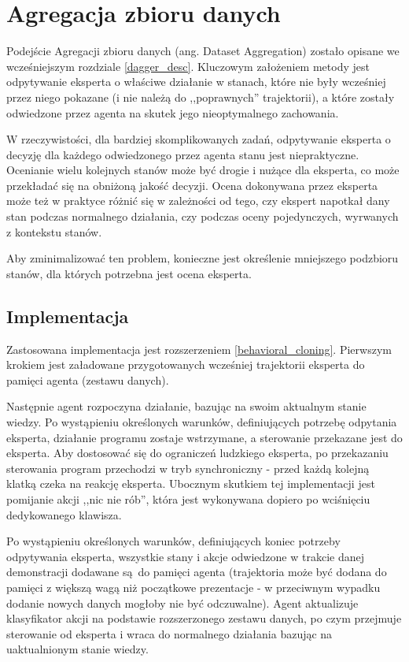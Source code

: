 \section{Agregacja zbioru danych}\label{dagger}

Podejście Agregacji zbioru danych (ang. Dataset Aggregation) \cite{DBLP:journals/corr/abs-1011-0686} zostało opisane we wcześniejszym rozdziale \ref{dagger_desc}. Kluczowym założeniem metody jest odpytywanie eksperta o właściwe działanie w stanach, które nie były wcześniej przez niego pokazane (i nie należą do ,,poprawnych'' trajektorii), a które zostały odwiedzone przez agenta na skutek jego nieoptymalnego zachowania.

W rzeczywistości, dla bardziej skomplikowanych zadań, odpytywanie eksperta o decyzję dla każdego odwiedzonego przez agenta stanu jest niepraktyczne. Ocenianie wielu kolejnych stanów może być drogie i nużące dla eksperta, co może przekładać się na obniżoną jakość decyzji. Ocena dokonywana przez eksperta może też w praktyce różnić się w zależności od tego, czy ekspert napotkał dany stan podczas normalnego działania, czy podczas oceny pojedynczych, wyrwanych z kontekstu stanów.

Aby zminimalizować ten problem, konieczne jest określenie mniejszego podzbioru stanów, dla których potrzebna jest ocena eksperta.


\subsection{Implementacja} 
Zastosowana implementacja jest rozszerzeniem \ref{behavioral_cloning}. Pierwszym krokiem jest załadowane przygotowanych wcześniej trajektorii eksperta do pamięci agenta (zestawu danych).

Następnie agent rozpoczyna działanie, bazując na swoim aktualnym stanie wiedzy. Po wystąpieniu określonych warunków, definiujących potrzebę odpytania eksperta, działanie programu zostaje wstrzymane, a sterowanie przekazane jest do eksperta. Aby dostosować się do ograniczeń ludzkiego eksperta, po przekazaniu sterowania program przechodzi w tryb synchroniczny - przed każdą kolejną klatką czeka na reakcję eksperta. Ubocznym skutkiem tej implementacji jest pomijanie akcji ,,nic nie rób'', która jest wykonywana dopiero po wciśnięciu dedykowanego klawisza.

Po wystąpieniu określonych warunków, definiujących koniec potrzeby odpytywania eksperta, wszystkie stany i akcje odwiedzone w trakcie danej demonstracji dodawane są do pamięci agenta (trajektoria może być dodana do pamięci z większą wagą niż początkowe prezentacje - w przeciwnym wypadku dodanie nowych danych mogłoby nie być odczuwalne). Agent aktualizuje klasyfikator akcji na podstawie rozszerzonego zestawu danych, po czym przejmuje sterowanie od eksperta i wraca do normalnego działania bazując na uaktualnionym stanie wiedzy.

